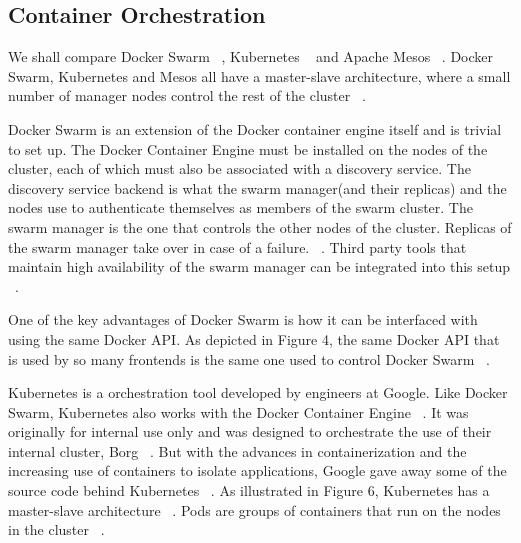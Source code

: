 \documentclass[10pt,twocolumn]{article}
\begin{document}
\subsection{Container Orchestration}

We shall compare Docker Swarm ~\cite{docker_swarm}, Kubernetes ~\cite{kubernetes} and Apache Mesos ~\cite{mesos}.
Docker Swarm, Kubernetes and Mesos all have a master-slave architecture, where a small number of manager nodes control the rest of the cluster ~\cite{docker_swarm, kubernetes, mesos}.

Docker Swarm is an extension of the Docker container engine itself and is trivial to set up.
The Docker Container Engine must be installed on the nodes of the cluster, each of which must also be associated with a discovery service.
The discovery service backend is what the swarm manager(and their replicas) and the nodes use to authenticate themselves as members of the swarm cluster.
The swarm manager is the one that controls the other nodes of the cluster.
Replicas of the swarm manager take over in case of a failure. ~\cite{docker_swarm}.
Third party tools that maintain high availability of the swarm manager can be integrated into this setup ~\cite{platform9_dockerswarm_kubernetes}.

One of the key advantages of Docker Swarm is how it can be interfaced with using the same Docker API.
As depicted in Figure 4, the same Docker API that is used by so many frontends is the same one used to control Docker Swarm ~\cite{platform9_dockerswarm_kubernetes}.

Kubernetes is a orchestration tool developed by engineers at Google.
Like Docker Swarm, Kubernetes also works with the Docker Container Engine ~\cite{kubernetes}.
It was originally for internal use only and was designed to orchestrate the use of their internal cluster, Borg ~\cite{borg}.
But with the advances in containerization and the increasing use of containers to isolate applications, Google gave away some of the source code behind Kubernetes ~\cite{kubernetes_github}.
As illustrated in Figure 6, Kubernetes has a master-slave architecture ~\cite{platform9_dockerswarm_kubernetes}.
Pods are groups of containers that run on the nodes in the cluster ~\cite{kubernetes}.
\end{document}
